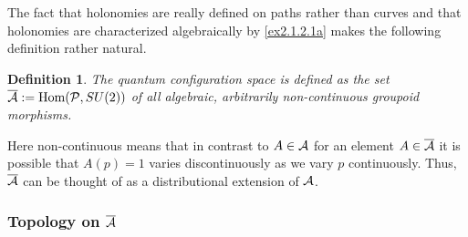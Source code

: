\documentclass[12pt]{report}
\newtheorem{Definition}{Definition}[section]
\def\a{{\cal A}}
\def\ab{\overline{\a}}
\begin{document}
%
The fact that holonomies are really defined on paths rather than curves 
and that holonomies are characterized algebraically by \ref{ex2.1.2.1a}
makes the following definition rather natural.
%
\begin{Definition} \label{def2.1.2.2}
The quantum configuration space is defined as the set
$\ab:=\mbox{Hom}({\cal P},SU(2))$ of all algebraic, arbitrarily 
non-continuous groupoid morphisms.
\end{Definition}
%
Here non-continuous means that in contrast to $A\in \a$ for an element
$A\in \ab$ it is possible that $A(p)=1$ varies discontinuously as we vary 
$p$ continuously. Thus, $\ab$ can be thought of as a distributional 
extension of $\a$.\\

\subsubsection{Topology on $\ab$}
\label{s2.1.2.2}
\end{document}
